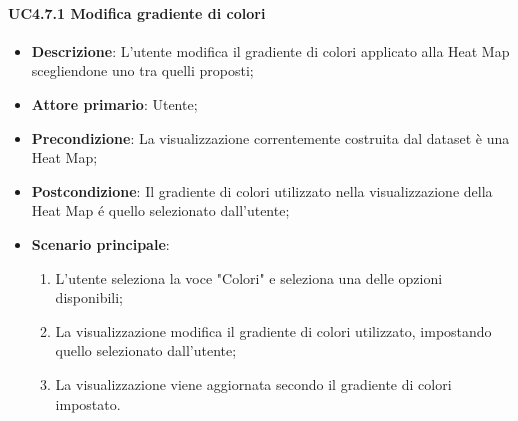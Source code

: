 \paragraph{UC4.7.1 Modifica gradiente di colori}
\label{par:uc4.7.1}
\begin{itemize}
    \item \textbf{Descrizione}: L’utente modifica il gradiente di colori applicato alla Heat Map scegliendone uno tra quelli proposti;
	
    \item \textbf{Attore primario}: Utente;
    
    \item \textbf{Precondizione}:   La visualizzazione correntemente costruita dal dataset è una Heat Map;
    \item \textbf{Postcondizione}:  Il gradiente di colori utilizzato nella visualizzazione della Heat Map é quello selezionato dall'utente;

	\item \textbf{Scenario principale}:
        \begin{enumerate}
            \item L'utente seleziona la voce "Colori" e seleziona una delle opzioni disponibili;
            \item La visualizzazione modifica il gradiente di colori utilizzato, impostando quello selezionato dall'utente;
            \item La visualizzazione viene aggiornata secondo il gradiente di colori impostato.
        \end{enumerate}
\end{itemize}

